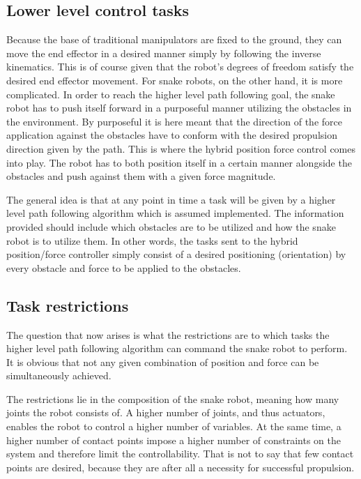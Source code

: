 \subsection{Lower level control tasks}

Because the base of traditional manipulators are fixed to the ground, they can move the end effector in a desired manner simply by following the inverse kinematics. This is of course given that the robot's degrees of freedom satisfy the desired end effector movement. For snake robots, on the other hand, it is more complicated.
In order to reach the higher level path following goal, the snake robot has to push itself forward in a purposeful manner utilizing the obstacles in the environment. By purposeful it is here meant that the direction of the force application against the obstacles have to conform with the desired propulsion direction given by the path. This is where the hybrid position force control comes into play. The robot has to both position itself in a certain manner alongside the obstacles and push against them with a given force magnitude.

The general idea is that at any point in time a task will be given by a higher level path following algorithm which is assumed implemented. The information provided should include which obstacles are to be utilized and how the snake robot is to utilize them. In other words, the tasks sent to the hybrid position/force controller simply consist of a desired positioning (orientation) by every obstacle and force to be applied to the obstacles.



\subsection{Task restrictions}\label{subsec:task-restrictions}

The question that now arises is what the restrictions are to which tasks the higher level path following algorithm can command the snake robot to perform. It is obvious that not any given combination of position and force can be simultaneously achieved.

The restrictions lie in the composition of the snake robot, meaning how many joints the robot consists of. A higher number of joints, and thus actuators, enables the robot to control a higher number of variables. At the same time, a higher number of contact points impose a higher number of constraints on the system and therefore limit the controllability. That is not to say that few contact points are desired, because they are after all a necessity for successful propulsion.

